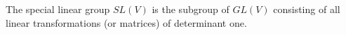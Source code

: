 The special linear group $SL(V)$ is the subgroup of $GL(V)$ consisting of all linear transformations (or matrices) of determinant one.
